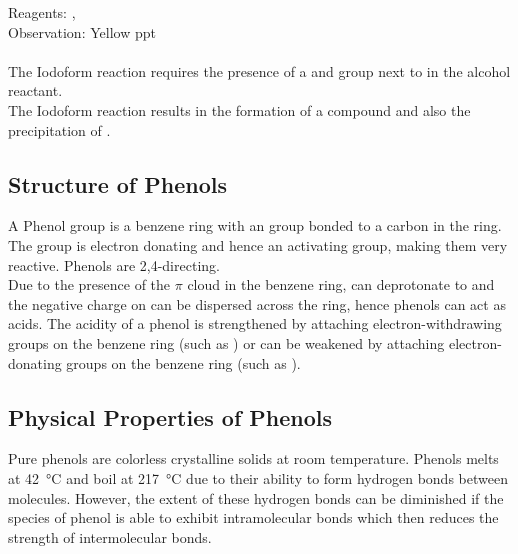 \documentclass[../main]{subfiles}
\begin{document}
	Reagents: ,  \\
	Observation: Yellow ppt  \\

	 \\

	The Iodoform reaction requires the presence of a  and  group next to  in the alcohol reactant. \\

	The Iodoform reaction results in the formation of a  compound and also the precipitation of . \\

	\subsection{Structure of Phenols}

	A Phenol group is a benzene ring with an  group bonded to a carbon in the ring. \\

	The  group is electron donating and hence an activating group, making them very reactive. Phenols are 2,4-directing. \\

	Due to the presence of the \(\pi\)  cloud in the benzene ring,  can deprotonate to  and the negative charge on  can be dispersed across the ring, hence phenols can act as acids. The acidity of a phenol is strengthened by attaching electron-withdrawing groups on the benzene ring (such as ) or can be weakened by attaching electron-donating groups on the benzene ring (such as ).

	\subsection{Physical Properties of Phenols}

	Pure phenols are colorless crystalline solids at room temperature. Phenols melts at \SI{42}{\celsius} and boil at \SI{217}{\celsius} due to their ability to form hydrogen bonds between molecules. However, the extent of these hydrogen bonds can be diminished if the species of phenol is able to exhibit intramolecular  bonds which then reduces the strength of intermolecular bonds.
\end{document}
